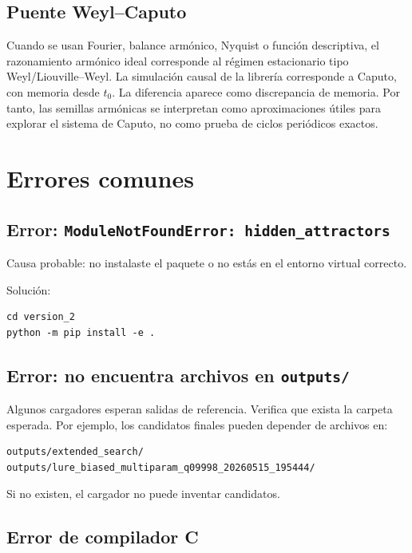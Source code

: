 \documentclass[11pt,letterpaper]{article}
\begin{document}
\subsection{Puente Weyl--Caputo}

Cuando se usan Fourier, balance armónico, Nyquist o función descriptiva, el razonamiento armónico ideal corresponde al régimen estacionario tipo Weyl/Liouville--Weyl. La simulación causal de la librería corresponde a Caputo, con memoria desde $t_0$. La diferencia aparece como discrepancia de memoria. Por tanto, las semillas armónicas se interpretan como aproximaciones útiles para explorar el sistema de Caputo, no como prueba de ciclos periódicos exactos.

\section{Errores comunes}

\subsection{Error: \texttt{ModuleNotFoundError: hidden\_attractors}}

Causa probable: no instalaste el paquete o no estás en el entorno virtual correcto.

Solución:

\begin{lstlisting}[style=terminal]
cd version_2
python -m pip install -e .
\end{lstlisting}

\subsection{Error: no encuentra archivos en \texttt{outputs/}}

Algunos cargadores esperan salidas de referencia. Verifica que exista la carpeta esperada. Por ejemplo, los candidatos finales pueden depender de archivos en:

\begin{lstlisting}[style=terminal]
outputs/extended_search/
outputs/lure_biased_multiparam_q09998_20260515_195444/
\end{lstlisting}

Si no existen, el cargador no puede inventar candidatos.

\subsection{Error de compilador C}
\end{document}
